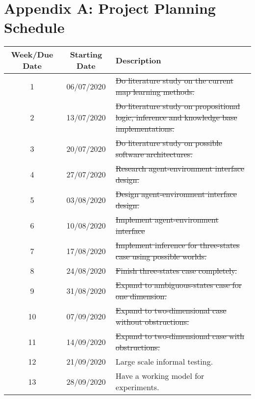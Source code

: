 \setcounter{table}{0}
\renewcommand{\thetable}{A.\arabic{table}}

\chapter{Appendix A:  Project Planning Schedule}

 \begin{table}[H]
  \begin{center}
    \begin{tabular}{|c|c|p{8cm}|} 
    \hline
      \textbf{Week/Due Date} & \textbf{Starting Date} & \textbf{Description}\\
      \hline
      \hline
      1 & 06/07/2020 & \sout{Do literature study on the current map learning methods.}\\ \hline
      
      2 & 13/07/2020 & \sout{Do literature study on propositional logic, 
      inference and knowledge base implementations.}\\ \hline
      
      3 & 20/07/2020 & \sout{Do literature study on possible software architectures.}\\ \hline
      
      4 & 27/07/2020 &  \sout{Research agent-environment interface design.} \\ \hline
      
      5  & 03/08/2020 & \sout{Design agent-environment interface design.}  \\ \hline
      
      6 & 10/08/2020 & \sout{Implement agent-environment interface}\\ \hline
      
      7 & 17/08/2020 & \sout{Implement inference for three-states case using possible worlds.} \\ \hline
      
      8 & 24/08/2020 & \sout{Finish three-states case completely.}\\ \hline
      
      9 & 31/08/2020 & \sout{Expand to ambiguous-states case for one dimension.}\\ \hline
      10 & 07/09/2020 & \sout{Expand to two-dimensional case without obstructions.}\\ \hline
      11 & 14/09/2020 & \sout{Expand to two-dimensional case with obstructions.}\\ \hline
      12 & 21/09/2020 & Large scale informal testing.\\ \hline
      13 & 28/09/2020 & Have a working model for experiments.\\ \hline


\end{tabular}
\end{center}
\end{table}
